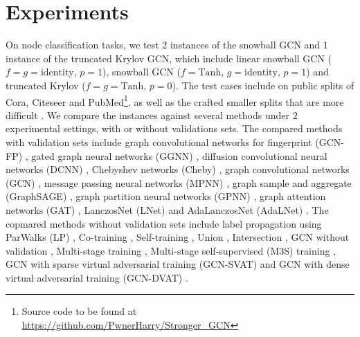 \documentclass{article}
\begin{document}
\section{Experiments}\label{sec:experiments}
On node classification tasks, we test $2$ instances of the snowball GCN and $1$ instance of the truncated Krylov GCN, which include linear snowball GCN ($f=g=\mbox{identity}$, $p=1$), snowball GCN ($f=\mbox{Tanh}$, $g=\mbox{identity}$, $p=1$) and truncated Krylov ($f=g=\mbox{Tanh}$, $p=0$). The test cases include on public splits \cite{yang2016revisiting,liao2019lanczos} of Cora, Citeseer and PubMed\footnote{Source code to be found at \url{https://github.com/PwnerHarry/Stronger_GCN}}, as well as the crafted smaller splits that are more difficult \cite{liao2019lanczos,li2018deeper,sun2019stage}. We compare the instances against several methods under $2$ experimental settings, with or without validations sets. The compared methods with validation sets include graph convolutional networks for fingerprint (GCN-FP) \cite{duvenaud2015convolutional}, gated graph neural networks (GGNN) \cite{li2015gated}, diffusion convolutional neural networks (DCNN) \cite{atwood2015diffusion}, Chebyshev networks (Cheby) \cite{defferrard2016fast}, graph convolutional networks (GCN) \cite{kipf2016classification}, message passing neural networks (MPNN) \cite{gilmer2017neural}, graph sample and aggregate (GraphSAGE) \cite{hamilton2017inductive}, graph partition neural networks (GPNN) \cite{liao2018graph}, graph attention networks (GAT) \cite{velivckovic2017attention}, LanczosNet (LNet) \cite{liao2019lanczos} and AdaLanczosNet (AdaLNet) \cite{liao2019lanczos}.
The copmared methods without validation sets include label propagation using ParWalks (LP) \cite{wu2012learning}, Co-training \cite{li2018deeper}, Self-training \cite{li2018deeper}, Union \cite{li2018deeper}, Intersection \cite{li2018deeper}, GCN without validation \cite{li2018deeper}, Multi-stage training \cite{sun2019stage}, Multi-stage self-supervised (M3S) training \cite{sun2019stage}, GCN with sparse virtual adversarial training (GCN-SVAT) \cite{sun2019virtual} and GCN with dense virtual adversarial training (GCN-DVAT) \cite{sun2019virtual}.
\end{document}

